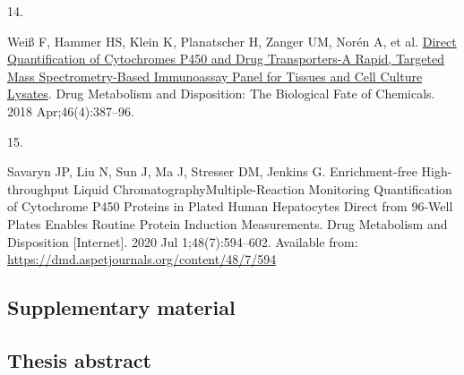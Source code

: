 \documentclass[
  letterpaper,
  DIV=11,
  numbers=noendperiod,
  oneside]{scrartcl}
\newlength{\cslhangindent}
\newlength{\csllabelwidth}
\newenvironment{CSLReferences}[2] %
 {\begin{list}{}{%
  \setlength{\itemindent}{0pt}
  \setlength{\leftmargin}{0pt}
  \setlength{\parsep}{0pt}
  \ifodd #1
   \setlength{\leftmargin}{\cslhangindent}
   \setlength{\itemindent}{-1\cslhangindent}
  \fi
  \setlength{\itemsep}{#2\baselineskip}}}
 {\end{list}}
\newcommand{\CSLLeftMargin}[1]{\parbox[t]{\csllabelwidth}{\strut#1\strut}}
\newcommand{\CSLRightInline}[1]{\parbox[t]{\linewidth - \csllabelwidth}{\strut#1\strut}}
\begin{document}
\begin{CSLReferences}{0}{1}
\CSLLeftMargin{14. }%
\CSLRightInline{Weiß F, Hammer HS, Klein K, Planatscher H, Zanger UM,
Norén A, et al. \href{https://doi.org/10.1124/dmd.117.078626}{Direct
Quantification of Cytochromes P450 and Drug Transporters-A Rapid,
Targeted Mass Spectrometry-Based Immunoassay Panel for Tissues and Cell
Culture Lysates}. Drug Metabolism and Disposition: The Biological Fate
of Chemicals. 2018 Apr;46(4):387--96. }

\CSLLeftMargin{15. }%
\CSLRightInline{Savaryn JP, Liu N, Sun J, Ma J, Stresser DM, Jenkins G.
Enrichment-free High-throughput Liquid
Chromatography{\textendash}Multiple-Reaction Monitoring Quantification
of Cytochrome P450 Proteins in Plated Human Hepatocytes Direct from
96-Well Plates Enables Routine Protein Induction Measurements. Drug
Metabolism and Disposition {[}Internet{]}. 2020 Jul 1;48(7):594--602.
Available from: \url{https://dmd.aspetjournals.org/content/48/7/594}}

\end{CSLReferences}

\subsection{Supplementary material}\label{supplementary-material}

\subsection{Thesis abstract}\label{thesis-abstract}
\end{document}
